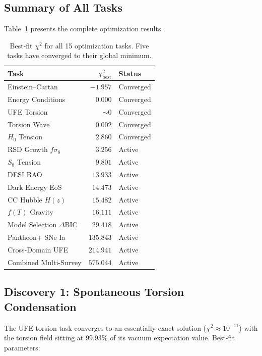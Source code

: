 \documentclass[twocolumn,prd,superscriptaddress,nofootinbib]{revtex4-2}
\begin{document}
\subsection{Summary of All Tasks}

Table~\ref{tab:scoreboard} presents the complete optimization results.

\begin{table}[h]
\caption{Best-fit $\chi^2$ for all 15 optimization tasks. Five tasks have converged to their global minimum.}
\label{tab:scoreboard}
\begin{ruledtabular}
\begin{tabular}{lrl}
Task & $\chi^2_\text{best}$ & Status \\
\hline
Einstein--Cartan & $-1.957$ & Converged \\
Energy Conditions & $0.000$ & Converged \\
UFE Torsion & $\sim 0$ & Converged \\
Torsion Wave & $0.002$ & Converged \\
$H_0$ Tension & $2.860$ & Converged \\
RSD Growth $f\sigma_8$ & $3.256$ & Active \\
$S_8$ Tension & $9.801$ & Active \\
DESI BAO & $13.933$ & Active \\
Dark Energy EoS & $14.473$ & Active \\
CC Hubble $H(z)$ & $15.482$ & Active \\
$f(T)$ Gravity & $16.111$ & Active \\
Model Selection $\Delta$BIC & $29.418$ & Active \\
Pantheon+ SNe Ia & $135.843$ & Active \\
Cross-Domain UFE & $214.941$ & Active \\
Combined Multi-Survey & $575.044$ & Active \\
\end{tabular}
\end{ruledtabular}
\end{table}

\subsection{Discovery 1: Spontaneous Torsion Condensation}

The UFE torsion task converges to an essentially exact solution ($\chi^2 \approx 10^{-11}$) with the torsion field sitting at 99.93\% of its vacuum expectation value. Best-fit parameters:
\end{document}
